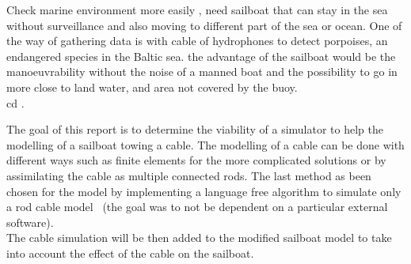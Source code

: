Check marine environment more easily , need sailboat that can stay in the sea without surveillance 
and also moving to different part of the sea or ocean. One of the way of gathering data is with cable of 
hydrophones to detect porpoises, an endangered species in the Baltic sea. the advantage of the sailboat would be the manoeuvrability without the noise of a manned boat and the possibility to go in more close to land water, and area not covered by the buoy.\\
cd .


The goal of this report is to determine the viability of a simulator to help
the modelling of a sailboat towing a cable. The modelling of a cable can be done
with different ways such as finite elements for the more complicated solutions or by assimilating the cable
as multiple connected rods. The last method as been chosen for the model by implementing a language free algorithm to simulate
only a rod cable model~\cite{johansen2007modelling} (the goal was to not be dependent on a particular external software).\\
The cable simulation will be then added to the modified sailboat model to take into account the effect of
the cable on the sailboat.